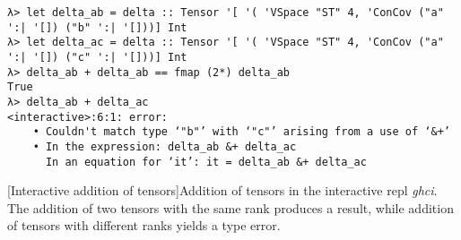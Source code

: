 \begin{code}
  \begin{verbatim}
λ> let delta_ab = delta :: Tensor '[ '( 'VSpace "ST" 4, 'ConCov ("a" ':| '[]) ("b" ':| '[]))] Int
λ> let delta_ac = delta :: Tensor '[ '( 'VSpace "ST" 4, 'ConCov ("a" ':| '[]) ("c" ':| '[]))] Int
λ> delta_ab + delta_ab == fmap (2*) delta_ab
True
λ> delta_ab + delta_ac
<interactive>:6:1: error:
    • Couldn't match type ‘"b"’ with ‘"c"’ arising from a use of ‘&+’
    • In the expression: delta_ab &+ delta_ac
      In an equation for ‘it’: it = delta_ab &+ delta_ac
  \end{verbatim}
  [Interactive addition of tensors]{Addition of tensors in the interactive repl \emph{ghci}. The addition of two tensors with the same rank produces a result, while addition of tensors with different ranks yields a type error.}
  \label{repl_addition}
\end{code}

\newpage

